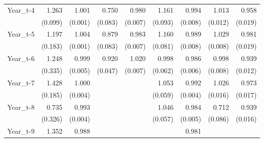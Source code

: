 \begin{table}[htbp]
\begin{tabular}{l*{8}{D{.}{.}{-1}}}
Year\_t-4            &       1.263\sym{***}&       1.001         &       0.750\sym{***}&       0.980\sym{***}&       1.161\sym{*}  &       0.994         &       1.013         &       0.958\sym{**} \\
                    &     (0.099)         &     (0.001)         &     (0.083)         &     (0.007)         &     (0.093)         &     (0.008)         &     (0.012)         &     (0.019)         \\
Year\_t-5            &       1.197         &       1.004\sym{***}&       0.879         &       0.983\sym{**} &       1.160\sym{**} &       0.989         &       1.029\sym{***}&       0.981         \\
                    &     (0.183)         &     (0.001)         &     (0.083)         &     (0.007)         &     (0.081)         &     (0.008)         &     (0.008)         &     (0.019)         \\
Year\_t-6            &       1.248         &       0.999         &       0.920\sym{\%}  &       1.020\sym{***}&       0.998         &       0.986\sym{**} &       0.998         &       0.939\sym{***}\\
                    &     (0.335)         &     (0.005)         &     (0.047)         &     (0.007)         &     (0.062)         &     (0.006)         &     (0.008)         &     (0.012)         \\
Year\_t-7            &       1.428\sym{***}&       1.000         &                     &                     &       1.053         &       0.992\sym{*}  &       1.026\sym{\%}  &       0.973\sym{\%}  \\
                    &     (0.185)         &     (0.004)         &                     &                     &     (0.059)         &     (0.004)         &     (0.016)         &     (0.017)         \\
Year\_t-8            &       0.735         &       0.993\sym{*}  &                     &                     &       1.046         &       0.984\sym{***}&       0.712\sym{***}&       0.939\sym{***}\\
                    &     (0.326)         &     (0.004)         &                     &                     &     (0.057)         &     (0.005)         &     (0.086)         &     (0.016)         \\
Year\_t-9            &       1.352         &       0.988\sym{***}&                     &                     &                     &       0.981\sym{**} &                     &                     \\

\end{tabular}
\end{table}
